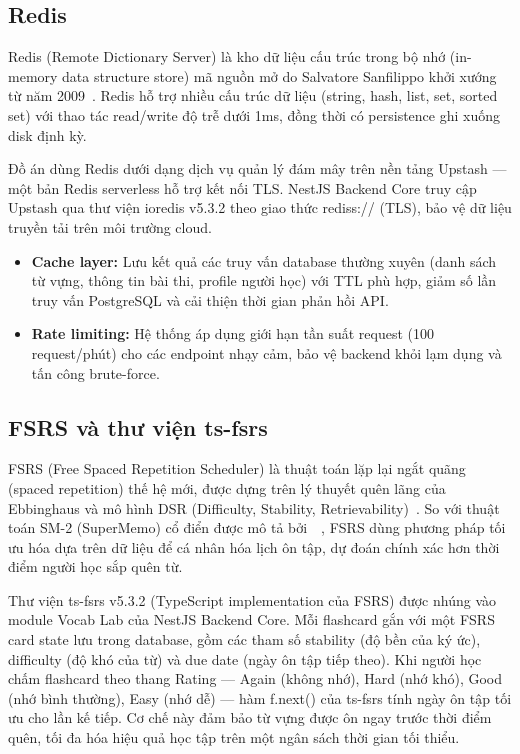 \subsection{Redis}

Redis (Remote Dictionary Server) là kho dữ liệu cấu trúc trong bộ nhớ (in-memory data structure store) mã nguồn mở do Salvatore Sanfilippo khởi xướng từ năm 2009~\cite{redis-docs}. Redis hỗ trợ nhiều cấu trúc dữ liệu (string, hash, list, set, sorted set) với thao tác read/write độ trễ dưới 1ms, đồng thời có persistence ghi xuống disk định kỳ.

Đồ án dùng Redis dưới dạng dịch vụ quản lý đám mây trên nền tảng Upstash --- một bản Redis serverless hỗ trợ kết nối TLS. NestJS Backend Core truy cập Upstash qua thư viện ioredis v5.3.2 theo giao thức rediss:// (TLS), bảo vệ dữ liệu truyền tải trên môi trường cloud.

\begin{itemize}
    \item \textbf{Cache layer:} Lưu kết quả các truy vấn database thường xuyên (danh sách từ vựng, thông tin bài thi, profile người học) với TTL phù hợp, giảm số lần truy vấn PostgreSQL và cải thiện thời gian phản hồi API.
    \item \textbf{Rate limiting:} Hệ thống áp dụng giới hạn tần suất request (100 request/phút) cho các endpoint nhạy cảm, bảo vệ backend khỏi lạm dụng và tấn công brute-force.
\end{itemize}

\subsection{FSRS và thư viện ts-fsrs}

FSRS (Free Spaced Repetition Scheduler) là thuật toán lặp lại ngắt quãng (spaced repetition) thế hệ mới, được dựng trên lý thuyết quên lãng của Ebbinghaus và mô hình DSR (Difficulty, Stability, Retrievability)~\cite{ye2022fsrs}. So với thuật toán SM-2 (SuperMemo) cổ điển được mô tả bởi~\citeauthor{wozniak1990spaced}~\cite{wozniak1990spaced}, FSRS dùng phương pháp tối ưu hóa dựa trên dữ liệu để cá nhân hóa lịch ôn tập, dự đoán chính xác hơn thời điểm người học sắp quên từ.

Thư viện ts-fsrs v5.3.2 (TypeScript implementation của FSRS) được nhúng vào module Vocab Lab của NestJS Backend Core. Mỗi flashcard gắn với một FSRS card state lưu trong database, gồm các tham số stability (độ bền của ký ức), difficulty (độ khó của từ) và due date (ngày ôn tập tiếp theo). Khi người học chấm flashcard theo thang Rating --- Again (không nhớ), Hard (nhớ khó), Good (nhớ bình thường), Easy (nhớ dễ) --- hàm f.next() của ts-fsrs tính ngày ôn tập tối ưu cho lần kế tiếp. Cơ chế này đảm bảo từ vựng được ôn ngay trước thời điểm quên, tối đa hóa hiệu quả học tập trên một ngân sách thời gian tối thiểu.

